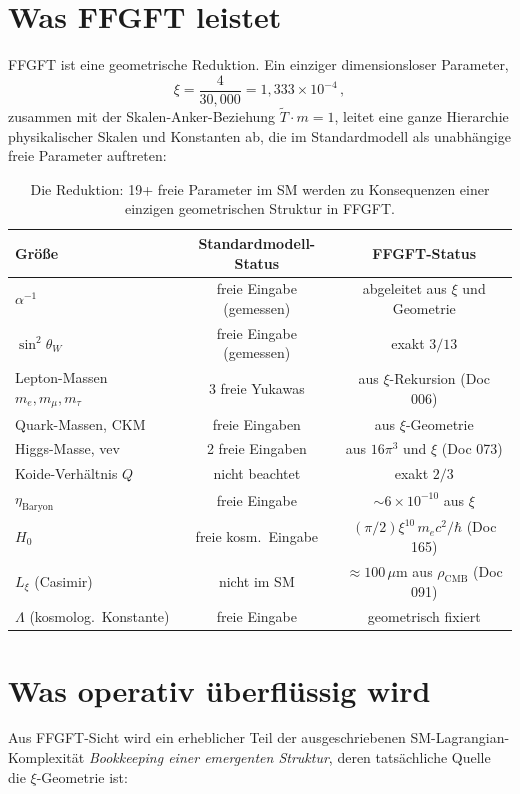 \documentclass[11pt,a4paper]{article}
\begin{document}
\section{Was FFGFT leistet}

FFGFT ist eine geometrische Reduktion. Ein einziger dimensionsloser Parameter,
\[
\xi = \frac{4}{30{,}000} = 1{,}333 \times 10^{-4}\,,
\]
zusammen mit der Skalen-Anker-Beziehung $\tilde T \cdot m = 1$, leitet eine ganze Hierarchie physikalischer Skalen und Konstanten ab, die im Standardmodell als unabhängige freie Parameter auftreten:

\begin{table}[h]
\centering\footnotesize
\begin{tabular}{lcc}
\toprule
\textbf{Größe} & \textbf{Standardmodell-Status} & \textbf{FFGFT-Status} \\
\midrule
$\alpha^{-1}$ & freie Eingabe (gemessen) & abgeleitet aus $\xi$ und Geometrie \\
$\sin^2\theta_W$ & freie Eingabe (gemessen) & exakt $3/13$ \\
Lepton-Massen $m_e, m_\mu, m_\tau$ & 3 freie Yukawas & aus $\xi$-Rekursion (Doc 006) \\
Quark-Massen, CKM & freie Eingaben & aus $\xi$-Geometrie \\
Higgs-Masse, vev & 2 freie Eingaben & aus $16\pi^3$ und $\xi$ (Doc 073) \\
Koide-Verhältnis $Q$ & nicht beachtet & exakt $2/3$ \\
$\eta_{\mathrm{Baryon}}$ & freie Eingabe & $\sim 6\times 10^{-10}$ aus $\xi$ \\
$H_0$ & freie kosm.\ Eingabe & $(\pi/2)\xi^{10}\,m_e c^2/\hbar$ (Doc 165) \\
$L_\xi$ (Casimir) & nicht im SM & $\approx 100\,\mu$m aus $\rho_{\mathrm{CMB}}$ (Doc 091) \\
$\Lambda$ (kosmolog.\ Konstante) & freie Eingabe & geometrisch fixiert \\
\bottomrule
\end{tabular}
\caption{Die Reduktion: 19+ freie Parameter im SM werden zu Konsequenzen einer einzigen geometrischen Struktur in FFGFT.}
\end{table}

\section{Was operativ überflüssig wird}

Aus FFGFT-Sicht wird ein erheblicher Teil der ausgeschriebenen SM-Lagrangian-Komplexität \emph{Bookkeeping einer emergenten Struktur}, deren tatsächliche Quelle die $\xi$-Geometrie ist:
\end{document}
